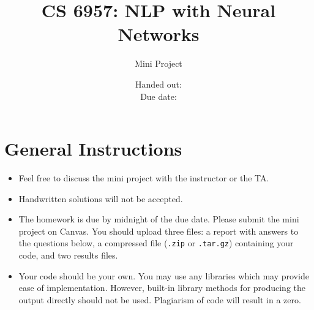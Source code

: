 \documentclass[12pt, fullpage,letterpaper]{article}
\title{CS 6957: NLP with Neural Networks \semester}
\author{Mini Project \assignmentId}
\date{Handed out: \releaseDate\\
  Due date: \dueDate}
\begin{document}
\maketitle

\section*{General Instructions}

{\footnotesize
  \begin{itemize}

  \item Feel free to discuss the mini project with the instructor or the TA.

  \item Handwritten solutions will not be accepted.

  \item  The homework is due by midnight of the due date. Please submit
    the mini project on Canvas. You should upload three files: a report with answers to the questions below, a compressed file (\texttt{.zip} or \texttt{.tar.gz}) containing your code, and two results files.

  \item Your code should be your own. You may use any libraries which may provide ease of implementation. However, built-in library methods for producing the output directly should not be used. Plagiarism of code will result in a zero.

  \end{itemize}


}


%



% 

\end{document}
